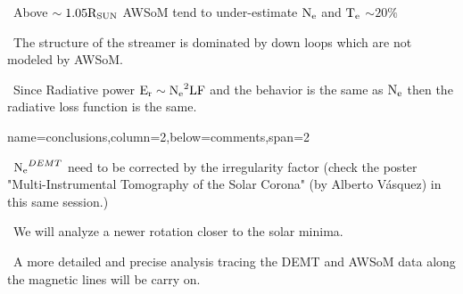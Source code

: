 \documentclass[paperwidth=100cm,paperheight=120cm]{baposter}
\def\bu{\textcolor{red}{\textbullet~}}
\def\bu{\textcolor{red}{\textbullet~}}
\begin{document}
\begin{poster}
{{\bu Above $\sim 1.05 {\rm R_{SUN}}$ AWSoM tend to under-estimate ${\rm N_e}$ and ${\rm T_e}$ $\sim 20 \%$

\bu The structure of the streamer is dominated by down loops which are not modeled by AWSoM.

\bu Since Radiative power ${\rm E_r}\sim {\rm N_e}^2 {\rm LF}$ and the behavior is the same as ${\rm N_e}$ then the radiative loss function is the same.
}
}

{name=conclusions,column=2,below=comments,span=2}{
{\footnotesize\sf
\bu ${\rm N_e}^ {DEMT}$ need to be corrected by the irregularity factor (check the poster "Multi-Instrumental Tomography of the Solar Corona" (by Alberto Vásquez) in this same session.)

\bu We will analyze a newer rotation closer to the solar minima.

\bu A more detailed and precise analysis tracing the DEMT and AWSoM data along the magnetic lines will be carry on.

}
}

\end{poster}%
\end{document}
